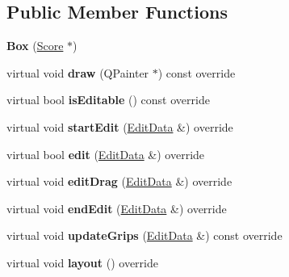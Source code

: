 \subsection*{Public Member Functions}
\begin{DoxyCompactItemize}
\item 
\mbox{\label{class_ms_1_1_box_ad9d6c9ce1a1cb38375907b21bf9037e4}} 
{\bfseries Box} (\hyperlink{class_ms_1_1_score}{Score} $\ast$)
\item 
\mbox{\label{class_ms_1_1_box_a1e11d84784fd1fccf2d6a1b79e09f806}} 
virtual void {\bfseries draw} (Q\+Painter $\ast$) const override
\item 
\mbox{\label{class_ms_1_1_box_a5f7d0d792131eace54681e6bab80a759}} 
virtual bool {\bfseries is\+Editable} () const override
\item 
\mbox{\label{class_ms_1_1_box_aba2f5041c4faa7b2daf1f576a8917c8f}} 
virtual void {\bfseries start\+Edit} (\hyperlink{class_ms_1_1_edit_data}{Edit\+Data} \&) override
\item 
\mbox{\label{class_ms_1_1_box_a97f090016b11cb01ca4ccdf2ea2de79b}} 
virtual bool {\bfseries edit} (\hyperlink{class_ms_1_1_edit_data}{Edit\+Data} \&) override
\item 
\mbox{\label{class_ms_1_1_box_a1faeeb4183d6a6b55ae63cc55b4c8f0c}} 
virtual void {\bfseries edit\+Drag} (\hyperlink{class_ms_1_1_edit_data}{Edit\+Data} \&) override
\item 
\mbox{\label{class_ms_1_1_box_a24f90baeb5d9bcbff8fadfb396ff9573}} 
virtual void {\bfseries end\+Edit} (\hyperlink{class_ms_1_1_edit_data}{Edit\+Data} \&) override
\item 
\mbox{\label{class_ms_1_1_box_aa74e715291fac350787a9e5a9b1e8c5f}} 
virtual void {\bfseries update\+Grips} (\hyperlink{class_ms_1_1_edit_data}{Edit\+Data} \&) const override
\item 
\mbox{\label{class_ms_1_1_box_a006eeff28de6e17264aac769e061fdd3}} 
virtual void {\bfseries layout} () override
\item 

\end{DoxyCompactItemize}
